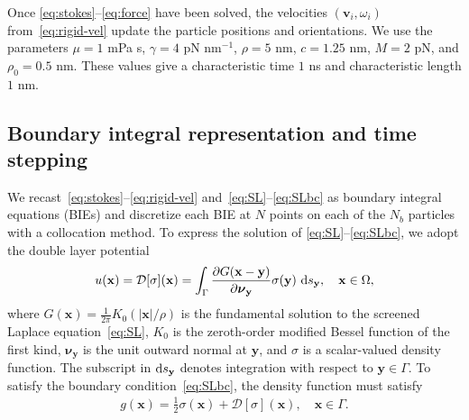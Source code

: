 \documentclass[prb,preprint,showpacs,preprintnumbers,amsmath,amssymb,longbibliography]{revtex4-1}
\newcommand{\DD}{\mathcal{D}}
\newcommand{\nnu}{\boldsymbol{\nu}}
\newcommand{\xx}{\mathbf{x}}
\renewcommand{\vv}{\mathbf{v}}
\newcommand{\yy}{\mathbf{y}}
\newcommand{\pderiv}[2]{\frac{\partial #1}{\partial #2}}
\begin{document}
Once \eqref{eq:stokes}--\eqref{eq:force} have been solved, the
velocities $(\vv_i, \omega_i)$ from~\eqref{eq:rigid-vel} update the
particle positions and orientations.  We use the parameters $\mu = 1$
mPa s, $\gamma = 4$ pN nm$^{-1}$, $\rho = 5$ nm, $c = 1.25$ nm, $M = 2$
pN, and $\rho_0 = 0.5$ nm.  These values give a characteristic time $1$
ns and characteristic length $1$ nm.

\subsection{Boundary integral representation and time stepping}
We recast~\eqref{eq:stokes}--\eqref{eq:rigid-vel}
and~\eqref{eq:SL}--\eqref{eq:SLbc} as boundary integral equations (BIEs)
and discretize each BIE at $N$ points on each of the $N_b$ particles
with a collocation method. To express the solution of
\eqref{eq:SL}--\eqref{eq:SLbc}, we adopt the double layer potential
\begin{align}
\label{eq:SL_BIE}
u({\xx}) = \DD[\sigma](\xx) = \int_\Gamma 
  \pderiv{G(\xx-\yy)}{\nnu_\yy}\sigma(\yy)\, \dif s_\yy, 
  \quad \xx \in \Omega,
\end{align}
where $G(\xx) = \frac{1}{2\pi}K_0(|\xx|/\rho)$ is the fundamental
solution to the screened Laplace equation~\eqref{eq:SL}, $K_0$ is the
zeroth-order modified Bessel function of the first kind, $\nnu_\yy$ is
the unit outward normal at $\yy$, and $\sigma$ is a scalar-valued
density function. The subscript in $\dif s_\yy$ denotes integration with
respect to $\yy \in \Gamma$. To satisfy the boundary
condition~\eqref{eq:SLbc}, the density function must satisfy
\begin{align}
  \label{eq:SL_BIE2}
  g(\xx) = \frac{1}{2} \sigma(\xx) + \DD[\sigma](\xx), \quad
    \xx \in \Gamma.
\end{align}
\end{document}

